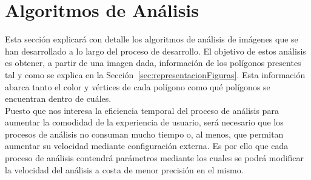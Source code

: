 \section{Algoritmos de Análisis}
\label{sec:algAnalisis}

Esta sección explicará con detalle los algoritmos de análisis de imágenes que se han desarrollado a lo largo del proceso de desarrollo. El objetivo de estos análisis es obtener, a partir de una imagen dada, información de los polígonos presentes tal y como se explica en la Sección~\ref{sec:representacionFiguras}. Esta información abarca tanto el color y vértices de cada polígono como qué polígonos se encuentran dentro de cuáles.\\

Puesto que nos interesa la eficiencia temporal del proceso de análisis para aumentar la comodidad de la experiencia de usuario, será necesario que los procesos de análisis no consuman mucho tiempo o, al menos, que permitan aumentar su velocidad mediante configuración externa. Es por ello que cada proceso de análisis contendrá parámetros mediante los cuales se podrá modificar la velocidad del análisis a costa de menor precisión en el mismo.\\

